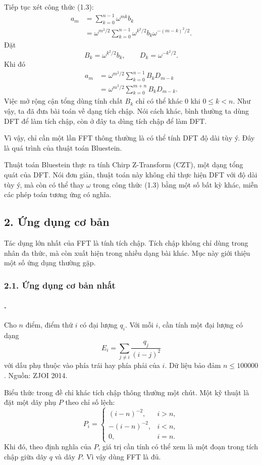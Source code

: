 \documentclass[11pt]{article}
\begin{document}
Tiếp tục xét công thức (1.3):
\[
\begin{aligned}
a_m
  &= \sum_{k=0}^{n-1}\omega^{mk}b_k\\
  &= \omega^{m^2/2}\sum_{k=0}^{n-1}\omega^{k^2/2}b_k
     \omega^{-(m-k)^2/2}.
\end{aligned}
\]
Đặt
\[
  B_k=\omega^{k^2/2}b_k,\qquad D_k=\omega^{-k^2/2}.
\]
Khi đó
\begin{align*}
a_m
  &= \omega^{m^2/2}\sum_{k=0}^{n-1}B_kD_{m-k} \tag{1.12}\\
  &= \omega^{m^2/2}\sum_{k=0}^{m+n}B_kD_{m-k}. \tag{1.13}
\end{align*}
Việc mở rộng cận tổng dùng tính chất \(B_k\) chỉ có thể khác \(0\) khi
\(0\le k<n\). Như vậy, ta đã đưa bài toán về dạng tích chập. Nói cách khác,
bình thường ta dùng DFT để làm tích chập, còn ở đây ta dùng tích chập để làm
DFT.

Vì vậy, chỉ cần một lần FFT thông thường là có thể tính DFT độ dài tùy ý. Đây
là quá trình của thuật toán Bluestein.

Thuật toán Bluestein thực ra tính Chirp Z-Transform (CZT), một dạng tổng quát
của DFT. Nói đơn giản, thuật toán này không chỉ thực hiện DFT với độ dài tùy
ý, mà còn có thể thay \(\omega\) trong công thức (1.3) bằng một số bất kỳ
khác, miễn các phép toán tương ứng có nghĩa.

\subsection*{2. Ứng dụng cơ bản}

Tác dụng lớn nhất của FFT là tính tích chập. Tích chập không chỉ dùng trong
nhân đa thức, mà còn xuất hiện trong nhiều dạng bài khác. Mục này giới thiệu
một số ứng dụng thường gặp.

\subsubsection*{2.1. Ứng dụng cơ bản nhất}

\paragraph{.}
Cho \(n\) điểm, điểm thứ \(i\) có đại lượng \(q_i\). Với mỗi \(i\), cần tính
một đại lượng có dạng
\[
  E_i=\sum_{j\ne i}\frac{q_j}{(i-j)^2}
\]
với dấu phụ thuộc vào phía trái hay phía phải của \(i\). Dữ liệu bảo đảm
\(n\le 100000\). Nguồn: ZJOI 2014.

Biểu thức trong đề chỉ khác tích chập thông thường một chút. Một kỹ thuật là
đặt một dãy phụ \(P\) theo chỉ số lệch:
\[
P_i=
\begin{cases}
(i-n)^{-2}, & i>n,\\
-(i-n)^{-2}, & i<n,\\
0, & i=n.
\end{cases}
\]
Khi đó, theo định nghĩa của \(P\), giá trị cần tính có thể xem là một đoạn
trong tích chập giữa dãy \(q\) và dãy \(P\). Vì vậy dùng FFT là đủ.
\end{document}
